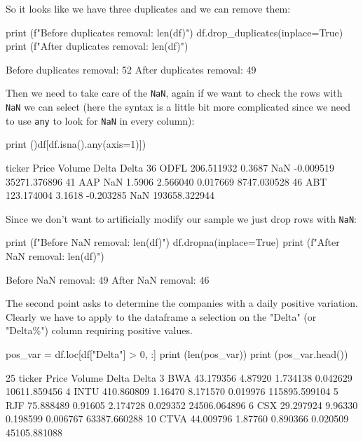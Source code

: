 \begin{solution}
So it looks like we have three duplicates and we can remove them:

\begin{ipython}
print (f"Before duplicates removal: {len(df)}")
df.drop_duplicates(inplace=True)
print (f"After duplicates removal: {len(df)}")
\end{ipython}
\begin{ioutput}
Before duplicates removal: 52
After duplicates removal: 49
\end{ioutput}

Then we need to take care of the \texttt{NaN}, again if we want to check the rows with \texttt{NaN} we can select (here the syntax is a little bit more complicated since we need to use \texttt{any} to look for \texttt{NaN} in every column):

\begin{ipython}
print ()df[df.isna().any(axis=1)])
\end{ipython}
\begin{ioutput}
   ticker       Price  Volume     Delta    Delta%
36   ODFL  206.511932  0.3687       NaN -0.009519   35271.376896
41    AAP         NaN  1.5906  2.566040  0.017669    8747.030528
46    ABT  123.174004  3.1618 -0.203285       NaN  193658.322944
\end{ioutput}
        
Since we don't want to artificially modify our sample we just drop rows with \texttt{NaN}:

\begin{ipython}
print (f"Before NaN removal: {len(df)}")
df.dropna(inplace=True)
print (f"After NaN removal: {len(df)}")
\end{ipython}
\begin{ioutput}
Before NaN removal: 49
After NaN removal: 46
\end{ioutput}

The second point asks to determine the companies with a daily positive variation. Clearly we have to apply to the dataframe a selection on the "Delta" (or "Delta\%") column requiring positive values.

\begin{ipython}
pos_var = df.loc[df["Delta"] > 0, :]
print (len(pos_var))
print (pos_var.head())
\end{ipython}
\begin{ioutput}
25
   ticker       Price   Volume     Delta    Delta%
3     BWA   43.179356  4.87920  1.734138  0.042629   10611.859456
4    INTU  410.860809  1.16470  8.171570  0.019976  115895.599104
5     RJF   75.888489  0.91605  2.174728  0.029352   24506.064896
6     CSX   29.297924  9.96330  0.198599  0.006767   63387.660288
10   CTVA   44.009796  1.87760  0.890366  0.020509   45105.881088
\end{ioutput}
        

\end{solution}
